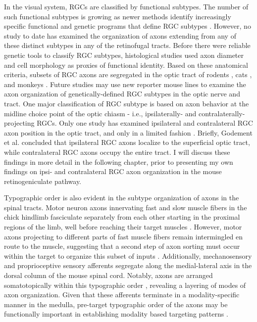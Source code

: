 In the visual system, RGCs are classified by functional subtypes.
The number of such functional subtypes is growing as newer methods identify increasingly specific functional and genetic programs that define RGC subtypes \cite{rivlin2011transgenic,baden2016functional}.
However, no study to date has examined the organization of axons extending from any of these distinct subtypes in any of the retinofugal tracts.
Before there were reliable genetic tools to classify RGC subtypes, histological studies used axon diameter and cell morphology as proxies of functional identity.
Based on these anatomical criteria, subsets of RGC axons are segregated in the optic tract of rodents \cite{reese1987distributionrat}, cats \cite{guillery1982arrangement,torrealba1982studies}, and monkeys \cite{reese1990fibre}.
Future studies may use new reporter mouse lines to examine the axon organization of genetically-defined RGC subtypes in the optic nerve and tract.
One major classification of RGC subtype is based on axon behavior at the midline choice point of the optic chiasm - i.e., ipsilaterally- and contralaterally-projecting RGCs.
Only one study has examined ipsilateral and contralateral RGC axon position in the optic tract, and only in a limited fashion \cite{godement1984prenatal}.
Briefly, Godement et al.  concluded that ipsilateral RGC axons localize to the superficial optic tract, while contralateral RGC axons occupy the entire tract.
I will discuss these findings in more detail in the following chapter, prior to presenting my own findings on ipsi- and contralateral RGC axon organization in the mouse retinogeniculate pathway.

Typographic order is also evident in the subtype organization of axons in the spinal tracts.
Motor neuron axons innervating fast and slow muscle fibers in the chick hindlimb fasciculate separately from each other starting in the proximal regions of the limb, well before reaching their target muscles \cite{milner1998selective}.
However, motor axons projecting to different parts of fast muscle fibers remain intermingled en route to the muscle, suggesting that a second step of axon sorting must occur within the target to organize this subset of inputs \cite{milner1998selective}.
Additionally, mechanosensory and proprioceptive sensory afferents segregate along the medial-lateral axis in the dorsal column of the mouse spinal cord.
Notably, axons are arranged somatotopically within this typographic order \cite{niu2013modality}, revealing a layering of modes of axon organization.
Given that these afferents terminate in a modality-specific manner in the medulla, pre-target typographic order of the axons may be functionally important in establishing modality based targeting patterns \cite{niu2013modality}.

